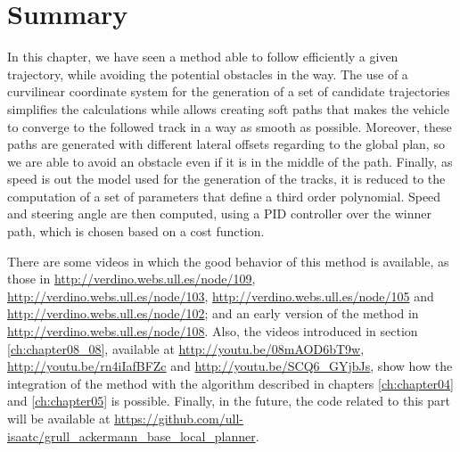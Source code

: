 % 

\section{Summary}\label{ch:chapter07_04}

In this chapter, we have seen a method able to follow efficiently a given trajectory, while avoiding the potential obstacles in the way. The use of a curvilinear coordinate system for the generation of a set of candidate trajectories simplifies the calculations while allows creating soft paths that makes the vehicle to converge to the followed track in a way as smooth as possible. Moreover, these paths are generated with different lateral offsets regarding to the global plan, so we are able to avoid an obstacle even if it is in the middle of the path. Finally, as speed is out the model used for the generation of the tracks, it is reduced to the computation of a set of parameters that define a third order polynomial. Speed and steering angle are then computed, using a \ac{PID} controller over the winner path, which is chosen based on a cost function.

There are some videos in which the good behavior of this method is available, as those in \url{http://verdino.webs.ull.es/node/109}, \url{http://verdino.webs.ull.es/node/103}, \url{http://verdino.webs.ull.es/node/105} and \url{http://verdino.webs.ull.es/node/102}; and an early version of the method in \url{http://verdino.webs.ull.es/node/108}. Also, the videos introduced in section \ref{ch:chapter08_08}, available at \url{http://youtu.be/08mAOD6bT9w}, \url{http://youtu.be/rn4iIafBFZc} and \url{http://youtu.be/SCQ6_GYjbJs}, show how the integration of the method with the algorithm described in chapters \ref{ch:chapter04} and \ref{ch:chapter05} is possible. Finally, in the future, the code related to this part will be available at \url{https://github.com/ull-isaatc/grull_ackermann_base_local_planner}. 

